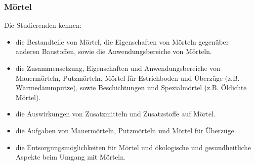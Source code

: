 \subsubsection*{Mörtel}
Die Studierenden kennen: 

\begin{itemize}[noitemsep]
	\item die Bestandteile von Mörtel, die Eigenschaften von Mörteln gegenüber anderen Baustoffen, sowie die Anwendungsbereiche von Mörteln. 
	\item die Zusammensetzung, Eigenschaften und Anwendungsbereiche von Mauermörteln, Putzmörteln, Mörtel für Estrichboden und Überzüge (z.B. Wärmedämmputze), sowie Beschichtungen und Spezialmörtel (z.B. Öldichte Mörtel).
	\item die Auswirkungen von Zusatzmitteln und Zusatzstoffe auf Mörtel.
	\item die Aufgaben von Mauermörteln, Putzmörteln und Mörtel für Überzüge.
	\item die Entsorgungsmöglichkeiten für Mörtel und ökologische und gesundheitliche Aspekte beim Umgang mit Mörteln.
\end{itemize}